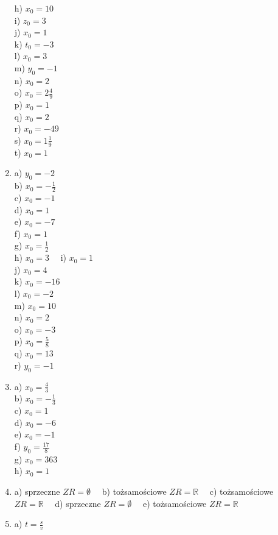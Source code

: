 \documentclass[10pt]{article}
\begin{document}
\begin{enumerate}
h) \(x_{0}=10\)\\
i) \(z_{0}=3\)\\
j) \(x_{0}=1\)\\
k) \(t_{0}=-3\)\\
l) \(x_{0}=3\)\\
m) \(y_{0}=-1\)\\
n) \(x_{0}=2\)\\
o) \(x_{0}=2 \frac{4}{9}\)\\
p) \(x_{0}=1\)\\
q) \(x_{0}=2\)\\
r) \(x_{0}=-49\)\\
s) \(x_{0}=1 \frac{1}{9}\)\\
t) \(x_{0}=1\)
  \item a) \(y_{0}=-2\)\\
b) \(x_{0}=-\frac{1}{2}\)\\
c) \(x_{0}=-1\)\\
d) \(x_{0}=1\)\\
e) \(x_{0}=-7\)\\
f) \(x_{0}=1\)\\
g) \(x_{0}=\frac{1}{2}\)\\
h) \(x_{0}=3 \quad\) i) \(x_{0}=1\)\\
j) \(x_{0}=4\)\\
k) \(x_{0}=-16\)\\
l) \(x_{0}=-2\)\\
m) \(x_{0}=10\)\\
n) \(x_{0}=2\)\\
o) \(x_{0}=-3\)\\
p) \(x_{0}=\frac{5}{8}\)\\
q) \(x_{0}=13\)\\
r) \(y_{0}=-1\)
  \item a) \(x_{0}=\frac{4}{3}\)\\
b) \(x_{0}=-\frac{1}{3}\)\\
c) \(x_{0}=1\)\\
d) \(x_{0}=-6\)\\
e) \(x_{0}=-1\)\\
f) \(y_{0}=\frac{17}{8}\)\\
g) \(x_{0}=363\)\\
h) \(x_{0}=1\)
  \item a) sprzeczne \(Z R=\emptyset \quad\) b) tożsamościowe \(Z R=\mathbb{R} \quad\) c) tożsamościowe \(Z R=\mathbb{R} \quad\) d) sprzeczne \(Z R=\emptyset \quad\) e) tożsamościowe \(Z R=\mathbb{R}\)
  \item a) \(t=\frac{s}{v}\)\\

\end{enumerate}
\end{document}
